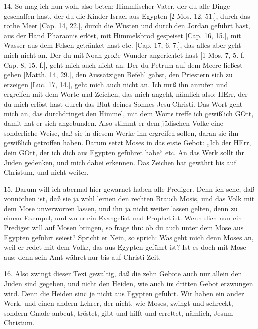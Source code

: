 14. So mag ich nun wohl also beten: Himmlischer Vater, der du alle Dinge geschaffen hast, der du die Kinder Israel aus Egypten [2 Mos. 12, 51.], durch das rothe Meer [Cap. 14, 22.], durch die Wüsten und durch den Jordan geführt hast, aus der Hand Pharaonis erlöst, mit Himmelsbrod gespeiset [Cap. 16, 15.], mit Wasser aus dem Felsen getränket hast etc. [Cap. 17, 6. 7.], das alles aber geht mich nicht an. Der du mit Noah große Wunder angerichtet hast [1 Mos. 7, 5. f. Cap. 8, 15. f.], geht mich auch nicht an. Der du Petrum auf dem Meere ließest gehen [Matth. 14, 29.], den Aussätzigen Befehl gabst, den Priestern sich zu erzeigen [Luc. 17, 14.], geht mich auch nicht an. Ich muß ihn anrufen und ergreifen mit dem Worte und Zeichen, das mich angeht, nämlich also: HErr, der du mich erlöst hast durch das Blut deines Sohnes Jesu Christi. Das Wort geht mich an, das durchdringet den Himmel, mit dem Worte treffe ich gewißlich GOtt, damit hat er sich angebunden. Also stimmt er dem jüdischen Volke eine sonderliche Weise, daß sie in diesem Werke ihn ergreifen sollen, daran sie ihn gewißlich getroffen haben. Darum setzt Moses in das erste Gebot: „Ich der HErr, dein GOtt, der ich dich aus Egypten geführet habe“ etc. An das Werk sollt ihr Juden gedenken, und mich dabei erkennen. Das Zeichen hat gewährt bis auf Christum, und nicht weiter.

15. Darum will ich abermal hier gewarnet haben alle Prediger. Denn ich sehe, daß vonnöthen ist, daß sie ja wohl lernen den rechten Brauch Mosis, und das Volk mit dem Mose unverworren lassen, und ihn ja nicht weiter lassen gelten, denn zu einem Exempel, und wo er ein Evangelist und Prophet ist. Wenn dich nun ein Prediger will auf Mosen bringen, so frage ihn: ob du auch unter dem Mose aus Egypten geführt seiest? Spricht er Nein, so sprich: Was geht mich denn Moses an, weil er redet mit dem Volke, das aus Egypten geführt ist? Ist es doch mit Mose aus; denn sein Amt währet nur bis auf Christi Zeit.

16. Also zwingt dieser Text gewaltig, daß die zehn Gebote auch nur allein den Juden sind gegeben, und nicht den Heiden, wie auch im dritten Gebot erzwungen wird. Denn die Heiden sind je nicht aus Egypten geführt. Wir haben ein ander Werk, und einen andern Lehrer, der nicht, wie Moses, zwingt und schreckt, sondern Gnade anbeut, tröstet, gibt und hilft und errettet, nämlich, Jesum Christum.

